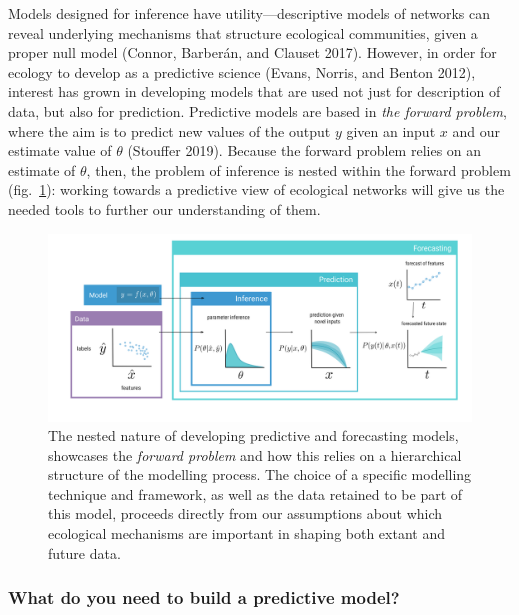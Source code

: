 \documentclass[11pt]{article}
\makeatletter
\def\maxwidth{\ifdim\Gin@nat@width>\linewidth\linewidth
\else\Gin@nat@width\fi}
\let\Oldincludegraphics\includegraphics
\renewcommand{\includegraphics}[1]{\Oldincludegraphics[width=\maxwidth]{#1}}
\makeatother
\begin{document}
Models designed for inference have utility---descriptive models of
networks can reveal underlying mechanisms that structure ecological
communities, given a proper null model (Connor, Barberán, and Clauset
2017). However, in order for ecology to develop as a predictive science
(Evans, Norris, and Benton 2012), interest has grown in developing
models that are used not just for description of data, but also for
prediction. Predictive models are based in \emph{the forward problem},
where the aim is to predict new values of the output \(y\) given an
input \(x\) and our estimate value of \(\theta\) (Stouffer 2019).
Because the forward problem relies on an estimate of \(\theta\), then,
the problem of inference is nested within the forward problem
(fig.~\ref{fig:models}): working towards a predictive view of ecological
networks will give us the needed tools to further our understanding of
them.

\begin{figure}
\hypertarget{fig:models}{%
\centering
\includegraphics{figures/forecasting_v4.png}
\caption{The nested nature of developing predictive and forecasting
models, showcases the \emph{forward problem} and how this relies on a
hierarchical structure of the modelling process. The choice of a
specific modelling technique and framework, as well as the data retained
to be part of this model, proceeds directly from our assumptions about
which ecological mechanisms are important in shaping both extant and
future data.}\label{fig:models}
}
\end{figure}

\hypertarget{what-do-you-need-to-build-a-predictive-model}{%
\subsubsection{What do you need to build a predictive
model?}\label{what-do-you-need-to-build-a-predictive-model}}
\end{document}
